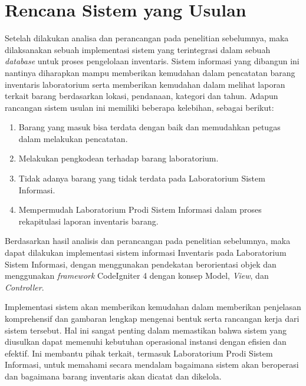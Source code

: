 \section{Rencana Sistem yang Usulan}
Setelah dilakukan analisa dan perancangan pada penelitian sebelumnya, maka dilaksanakan sebuah implementasi sistem yang terintegrasi dalam sebuah \textit{database} untuk proses pengelolaan inventaris. Sistem informasi yang dibangun ini nantinya diharapkan mampu memberikan kemudahan dalam pencatatan barang inventaris laboratorium serta memberikan kemudahan dalam melihat laporan terkait barang berdasarkan lokasi, pendanaan, kategori dan tahun. Adapun rancangan sistem usulan ini memiliki beberapa kelebihan, sebagai berikut:

\begin{enumerate}
  \item Barang yang masuk bisa terdata dengan baik dan memudahkan petugas dalam melakukan pencatatan.
  \item Melakukan pengkodean terhadap barang laboratorium.
  \item Tidak adanya barang yang tidak terdata pada Laboratorium Sistem Informasi.
  \item Mempermudah Laboratorium Prodi Sistem Informasi dalam proses rekapitulasi laporan inventaris barang.
\end{enumerate}

Berdasarkan hasil analisis dan perancangan pada penelitian sebelumnya, maka dapat dilakukan implementasi sistem informasi Inventaris pada Laboratorium Sistem Informasi, dengan menggunakan pendekatan berorientasi objek dan menggunakan \textit{framework} CodeIgniter 4 dengan konsep Model, \textit{View}, dan \textit{Controller}.

Implementasi sistem akan memberikan kemudahan dalam memberikan penjelasan komprehensif dan gambaran lengkap mengenai bentuk serta rancangan kerja dari sistem tersebut. Hal ini sangat penting dalam memastikan bahwa sistem yang diusulkan dapat memenuhi kebutuhan operasional instansi dengan efisien dan efektif. Ini membantu pihak terkait, termasuk Laboratorium Prodi Sistem Informasi, untuk memahami secara mendalam bagaimana sistem akan beroperasi dan bagaimana barang inventaris akan dicatat dan dikelola.

